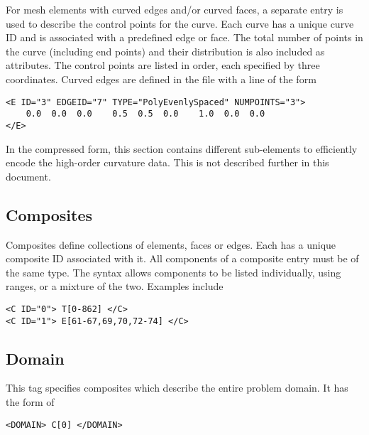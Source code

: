 For mesh elements with curved edges and/or curved faces, a separate entry is used to describe the control points for the curve. Each curve has a unique curve ID and is associated with a predefined edge or face. The total number of points in the curve (including end points) and their distribution is also included as attributes. The control points are listed in order, each specified by three coordinates. Curved edges are defined in the file with a line of the form
\begin{lstlisting}[style=XMLStyle]
<E ID="3" EDGEID="7" TYPE="PolyEvenlySpaced" NUMPOINTS="3">
    0.0  0.0  0.0    0.5  0.5  0.0    1.0  0.0  0.0
</E>
\end{lstlisting}

\begin{notebox}
    In the compressed form, this section contains different sub-elements to
    efficiently encode the high-order curvature data. This is not described
    further in this document.
\end{notebox}

\subsection{Composites}
Composites define collections of elements, faces or edges. Each has a unique composite ID associated with it. All components of a composite entry must be of the same type. The syntax allows components to be listed individually, using ranges, or a mixture of the two. Examples include
\begin{lstlisting}[style=XMLStyle]
<C ID="0"> T[0-862] </C>
<C ID="1"> E[61-67,69,70,72-74] </C>
\end{lstlisting}


\subsection{Domain}
This tag specifies composites which describe the entire problem domain. It has the form of
\begin{lstlisting}[style=XMLStyle]
<DOMAIN> C[0] </DOMAIN>
\end{lstlisting}
